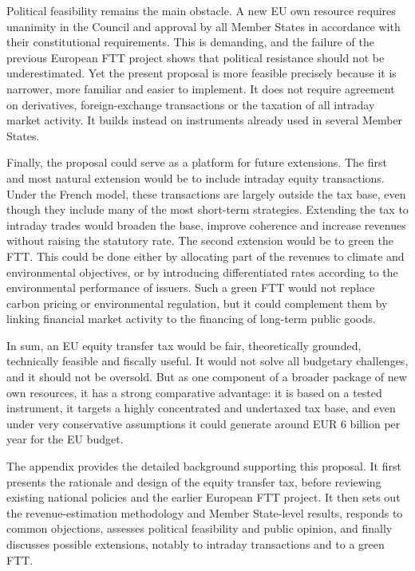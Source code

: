 \documentclass[../main]{subfiles}
\begin{document}
Political feasibility remains the main obstacle. A new EU own resource requires unanimity in the Council and approval by all Member States in accordance with their constitutional requirements. This is demanding, and the failure of the previous European FTT project shows that political resistance should not be underestimated. Yet the present proposal is more feasible precisely because it is narrower, more familiar and easier to implement. It does not require agreement on derivatives, foreign-exchange transactions or the taxation of all intraday market activity. It builds instead on instruments already used in several Member States.

Finally, the proposal could serve as a platform for future extensions. The first and most natural extension would be to include intraday equity transactions. Under the French model, these transactions are largely outside the tax base, even though they include many of the most short-term strategies. Extending the tax to intraday trades would broaden the base, improve coherence and increase revenues without raising the statutory rate. The second extension would be to green the FTT. This could be done either by allocating part of the revenues to climate and environmental objectives, or by introducing differentiated rates according to the environmental performance of issuers. Such a green FTT would not replace carbon pricing or environmental regulation, but it could complement them by linking financial market activity to the financing of long-term public goods.

In sum, an EU equity transfer tax would be fair, theoretically grounded, technically feasible and fiscally useful. It would not solve all budgetary challenges, and it should not be oversold. But as one component of a broader package of new own resources, it has a strong comparative advantage: it is based on a tested instrument, it targets a highly concentrated and undertaxed tax base, and even under very conservative assumptions it could generate around EUR 6 billion per year for the EU budget.

The appendix provides the detailed background supporting this proposal. It first presents the rationale and design of the equity transfer tax, before reviewing existing national policies and the earlier European FTT project. It then sets out the revenue-estimation methodology and Member State-level results, responds to common objections, assesses political feasibility and public opinion, and finally discusses possible extensions, notably to intraday transactions and to a green FTT.
\end{document}
